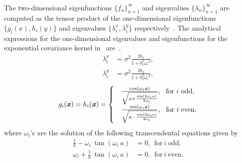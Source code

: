 \documentclass[letter,1p,11pt,oneside,onecolumn,sort&compress]{elsarticle}
\begin{document}
\

The two-dimensional eigenfunctions $ \{ f_{n} \}_{n=1}^\infty$ and eigenvalues $ \{ \lambda_n \}_{n=1}^\infty$ are computed as the tensor product of the one-dimensional eigenfunctions $\{g_i(x), h_i(y)\}$ and eigenvalues  $\{\lambda^x_i, \lambda^y_i\}$ respectively~\cite{ghanemSFEM1991,ghanem1999stochastic}.
The analytical expressions for the one-dimensional eigenvalues and eigenfunctions for the exponential covariance kernel in~ are~\cite{ghanemSFEM1991,ghanem1999stochastic},
\begin{align}\label{eq:eigenVal}
\lambda^x_i &= {\sigma}^2  \frac{2b_1}{1 + b_1^2 {\omega_i}^2}, \nonumber \\
\lambda^y_i &= {\sigma}^2  \frac{2b_2}{1 + b_2^2 {\omega_i}^2},
\end{align}
\begin{equation}
 g_i(\textbf{\textit{x}}) = h_i(\textbf{\textit{x}}) =
\begin{cases}
& \frac{\cos({\omega}_i\textbf{\textit{x}})}{\sqrt{a + \frac{\sin(2{\omega}_i a)}{2 {\omega}_i}}}, \ \  \text{for} \  i \ \text{odd},   \nonumber \\
 & \frac{\sin({\omega}_i\textbf{\textit{x}})}{\sqrt{a - \frac{\sin(2{\omega}_i a)}{2 {\omega}_i}}}, \ \  \text{for} \  i \ \text{even},
 \end{cases}
\label{eq:eigenVec}
\end{equation}
where $\omega_i$'s are the solution of the following transcendental equations given by~\cite{ghanemSFEM1991,ghanem1999stochastic}
\begin{align}
 \frac{1}{b} - {\omega_i} \ \tan(\omega_i \  a) &= 0, \ \  \text{for} \  i \ \text{odd},  \nonumber \\
 {\omega_i} + \frac{1}{b} \ \tan(\omega_i \  a) &= 0, \ \  \text{for} \  i \ \text{even}.
 \label{eq:2D_omegas}
\end{align}
\end{document}
